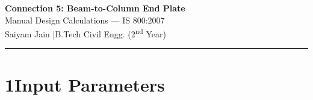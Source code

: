 \documentclass[12pt,a4paper]{article}
\begin{document}

\begin{center}
  {\LARGE\bfseries\sffamily\color{secteal}
   Connection 5: Beam-to-Column End Plate}\\[6pt]
  {\large\sffamily Manual Design Calculations — IS 800:2007}\\[4pt]
  {\normalsize Saiyam Jain \quad|\quad B.Tech Civil Engg. (2\textsuperscript{nd} Year)}
\end{center}
\rule{\linewidth}{1pt}

\section{1\quad Input Parameters}
\end{document}
